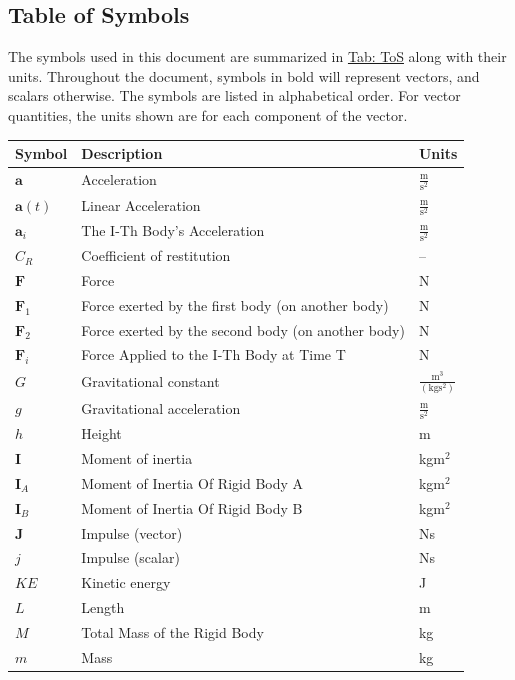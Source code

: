 \documentclass[12pt]{article}
\begin{document}
\subsection{Table of Symbols}
\label{Sec:ToS}
The symbols used in this document are summarized in \hyperref[Table:ToS]{Tab: ToS} along with their units. Throughout the document, symbols in bold will represent vectors, and scalars otherwise. The symbols are listed in alphabetical order. For vector quantities, the units shown are for each component of the vector.
\begin{longtabu}{l X[l] l}
\toprule
\textbf{Symbol} & \textbf{Description} & \textbf{Units}
\\
\midrule
\endhead
$\mathbf{a}$ & Acceleration & $\frac{\text{m}}{\text{s}^{2}}$
\\
$\mathbf{a}(t)$ & Linear Acceleration & $\frac{\text{m}}{\text{s}^{2}}$
\\
${\mathbf{a}_{i}}$ & The I-Th Body's Acceleration & $\frac{\text{m}}{\text{s}^{2}}$
\\
${C_{R}}$ & Coefficient of restitution & --
\\
$\mathbf{F}$ & Force & N
\\
${\mathbf{F}_{1}}$ & Force exerted by the first body (on another body) & N
\\
${\mathbf{F}_{2}}$ & Force exerted by the second body (on another body) & N
\\
${\mathbf{F}_{i}}$ & Force Applied to the I-Th Body at Time T & N
\\
$G$ & Gravitational constant & $\frac{\text{m}^{3}}{(\text{kg}\text{s}^{2})}$
\\
$g$ & Gravitational acceleration & $\frac{\text{m}}{\text{s}^{2}}$
\\
$h$ & Height & m
\\
$\mathbf{I}$ & Moment of inertia & kg$\text{m}^{2}$
\\
${\mathbf{I}_{A}}$ & Moment of Inertia Of Rigid Body A & kg$\text{m}^{2}$
\\
${\mathbf{I}_{B}}$ & Moment of Inertia Of Rigid Body B & kg$\text{m}^{2}$
\\
$\mathbf{J}$ & Impulse (vector) & Ns
\\
$j$ & Impulse (scalar) & Ns
\\
$KE$ & Kinetic energy & J
\\
$L$ & Length & m
\\
$M$ & Total Mass of the Rigid Body & kg
\\
$m$ & Mass & kg
\\

\end{longtabu}
\end{document}
